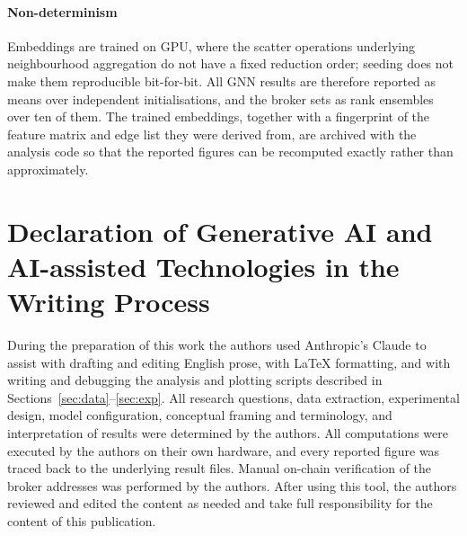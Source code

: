 \documentclass[final,5p,times]{elsarticle}
\begin{document}
\paragraph{Non-determinism} Embeddings are trained on GPU, where the
scatter operations underlying neighbourhood aggregation do not have a fixed
reduction order; seeding does not make them reproducible bit-for-bit. All
GNN results are therefore reported as means over independent
initialisations, and the broker sets as rank ensembles over ten of them. The
trained embeddings, together with a fingerprint of the feature matrix and
edge list they were derived from, are archived with the analysis code so
that the reported figures can be recomputed exactly rather than
approximately.


\section*{Declaration of Generative AI and AI-assisted Technologies in the
Writing Process}
During the preparation of this work the authors used Anthropic's Claude to
assist with drafting and editing English prose, with LaTeX formatting, and
with writing and debugging the analysis and plotting scripts described in
Sections~\ref{sec:data}--\ref{sec:exp}. All research questions, data
extraction, experimental design, model configuration, conceptual framing and
terminology, and interpretation of results were determined by the authors. All computations were executed by
the authors on their own hardware, and every reported figure was traced back
to the underlying result files. Manual on-chain verification of the broker
addresses was performed by the authors. After using this tool, the authors
reviewed and edited the content as needed and take full responsibility for
the content of this publication.
\end{document}
